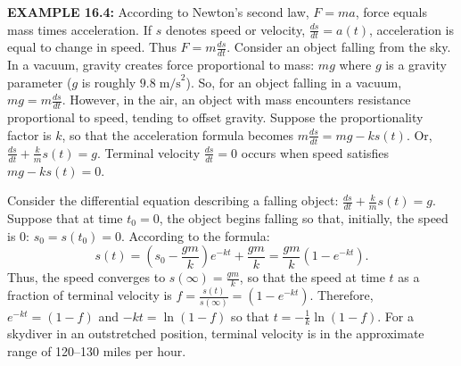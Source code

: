 \begin{original}
\textbf{EXAMPLE 16.4:} According to Newton's second law, $F = ma$, force equals mass times acceleration. If $s$ denotes speed or velocity, $\frac{ds}{dt} = a(t)$, acceleration is equal to change in speed. Thus $F = m\frac{ds}{dt}$. Consider an object falling from the sky. In a vacuum, gravity creates force proportional to mass: $mg$ where $g$ is a gravity parameter ($g$ is roughly $9.8\;\text{m/s}^2$). So, for an object falling in a vacuum, $mg = m\frac{ds}{dt}$. However, in the air, an object with mass encounters resistance proportional to speed, tending to offset gravity. Suppose the proportionality factor is $k$, so that the acceleration formula becomes $m\frac{ds}{dt} = mg - k s(t)$. Or, $\frac{ds}{dt} + \frac{k}{m}s(t) = g$. Terminal velocity $\frac{ds}{dt} = 0$ occurs when speed satisfies $mg - ks(t) = 0$.

Consider the differential equation describing a falling object: $\frac{ds}{dt} + \frac{k}{m}s(t) = g$. Suppose that at time $t_0 = 0$, the object begins falling so that, initially, the speed is $0$: $s_0 = s(t_0) = 0$. According to the formula:
\[
s(t) = \left(s_0 - \frac{gm}{k}\right)e^{-kt} + \frac{gm}{k} = \frac{gm}{k}(1 - e^{-kt}).
\]
Thus, the speed converges to $s(\infty) = \frac{gm}{k}$, so that the speed at time $t$ as a fraction of terminal velocity is $f = \frac{s(t)}{s(\infty)} = (1 - e^{-kt})$. Therefore, $e^{-kt} = (1 - f)$ and $-kt = \ln(1 - f)$ so that $t = -\frac{1}{k}\ln(1 - f)$. For a skydiver in an outstretched position, terminal velocity is in the approximate range of 120--130 miles per hour.
\end{original}
